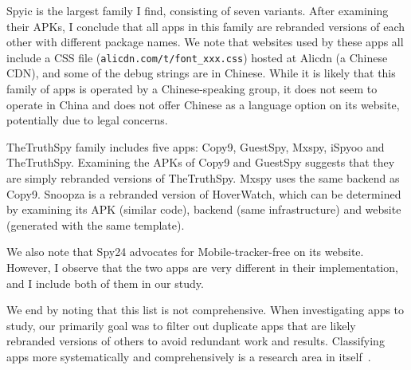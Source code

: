 Spyic is the largest family I find, consisting of seven variants.
After examining their APKs, I conclude that all apps in this family
are rebranded versions of each other with different package names.  We
note that websites used by these apps all include a CSS file
(\texttt{alicdn.com/t/font\_xxx.css}) hosted at Alicdn (a Chinese
CDN), and some of the debug strings are in Chinese.
While it is likely that this family of apps is operated
by a Chinese-speaking group, it does not seem to operate in China and
does not offer Chinese as a language option on its website,
potentially due to legal concerns.

TheTruthSpy family includes five apps: Copy9, GuestSpy, Mxspy, iSpyoo
and TheTruthSpy. Examining the APKs of Copy9 and GuestSpy suggests that
they are simply rebranded versions of TheTruthSpy. Mxspy uses the same
backend as Copy9.  Snoopza is a rebranded version of HoverWatch, which
can be determined by examining its APK (similar code), backend (same
infrastructure) and website (generated with the same
template).

We also note that Spy24 advocates for Mobile-tracker-free on its
website. However, I observe that the two apps are very different in
their implementation, and I include both of them in our study.

We end by noting that this list is not comprehensive.  When investigating apps
to study, our primarily goal was to filter out duplicate apps that are
likely rebranded versions of others to avoid redundant work and
results.  Classifying apps more systematically and comprehensively is
a research area in itself~\cite{SuarezTangil2013Dendroid,
Zhang2014Semantics, deshotels2014droidlegacy, pierazzi2020data}.


\newcommand{\hash}[1]{\texttt{#1}}

